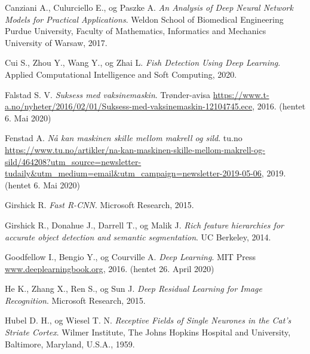 \documentclass[11ot]{article}
\begin{document}
\begin{thebibliography}{9}
Canziani A., Culurciello E., og Paszke A. 
\textit{An Analysis of Deep Neural Network Models for Practical Applications}. 
Weldon School of Biomedical Engineering Purdue University, Faculty of Mathematics, Informatics and Mechanics University of Warsaw, 2017.

Cui S., Zhou Y., Wang Y., og Zhai L. 
\textit{Fish Detection Using Deep Learning}. 
Applied Computational Intelligence and Soft Computing, 2020.



Falstad S. V.
\textit{Suksess med vaksinemaskin}. 
Trønder-avisa \url{https://www.t-a.no/nyheter/2016/02/01/Suksess-med-vaksinemaskin-12104745.ece}, 2016. (hentet 6. Mai 2020)

Fenstad A.
\textit{Nå kan maskinen skille mellom makrell og sild}. 
tu.no \url{https://www.tu.no/artikler/na-kan-maskinen-skille-mellom-makrell-og-sild/464208?utm_source=newsletter-tudaily&utm_medium=email&utm_campaign=newsletter-2019-05-06}, 2019. (hentet 6. Mai 2020)

Girshick R. 
\textit{Fast R-CNN}. 
Microsoft Research, 2015.

Girshick R., Donahue J., Darrell T., og Malik J. 
\textit{Rich feature hierarchies for accurate object detection and semantic segmentation}. 
UC Berkeley, 2014.

Goodfellow I., Bengio Y., og Courville A. 
\textit{Deep Learning}. 
MIT Press \url{www.deeplearningbook.org}, 2016. (hentet 26. April 2020)

He K., Zhang X., Ren S., og Sun J. 
\textit{Deep Residual Learning for Image Recognition}. 
Microsoft Research, 2015.


Hubel D. H., og Wiesel T. N. 
\textit{Receptive Fields of Single Neurones in the Cat's Striate Cortex}. 
 Wilmer Institute, The Johns Hopkins Hospital and University, Baltimore, Maryland, U.S.A., 1959.
 

\end{thebibliography}
\end{document}
